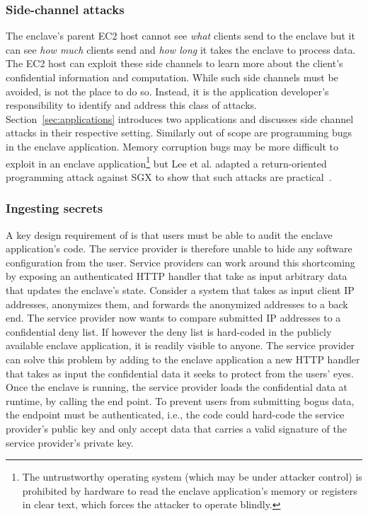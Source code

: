 \subsubsection{Side-channel attacks}
\label{sec:side-channels}

The enclave's parent EC2 host cannot see \emph{what} clients send to the enclave
but it can see \emph{how much} clients send and \emph{how long} it takes the
enclave to process data.  The EC2 host can exploit these side channels to learn
more about the client's confidential information and computation.  While such
side channels must be avoided, \tool{} is not the place to do so.  Instead, it
is the application developer's responsibility to identify and address this class
of attacks.  Section~\ref{sec:applications} introduces two applications and
discusses side channel attacks in their respective setting.  Similarly out of
scope are programming bugs in the enclave application.  Memory corruption bugs
may be more difficult to exploit in an enclave application\footnote{The
untrustworthy operating system (which may be under attacker control) is
prohibited by hardware to read the enclave application's memory or registers in
clear text, which forces the attacker to operate blindly.} but Lee et al.
adapted a return-oriented programming attack against SGX to show that such
attacks are practical~\cite{Lee2017a}.

\subsubsection{Ingesting secrets}
\label{sec:secrets}

A key design requirement of \tool{} is that users must be able to audit the
enclave application's code.  The service provider is therefore unable to hide
any software configuration from the user.  Service providers can work around
this shortcoming by exposing an authenticated HTTP handler that take as input
arbitrary data that updates the enclave's state.  Consider a system that takes
as input client IP addresses, anonymizes them, and forwards the anonymized
addresses to a back end.  The service provider
now wants to compare submitted IP addresses to a confidential deny list.  If
however the deny list is hard-coded in the publicly available enclave
application, it is readily visible to anyone.  The service provider can solve
this problem by adding to the enclave application a new HTTP handler that takes
as input the confidential data it seeks to protect from the users' eyes.  Once
the enclave is running, the service provider loads the confidential data at
runtime, by calling the end point.  To prevent users from submitting bogus data,
the endpoint must be authenticated, i.e., the code could hard-code the service
provider's public key and only accept data that carries a valid signature of the
service provider's private key.

